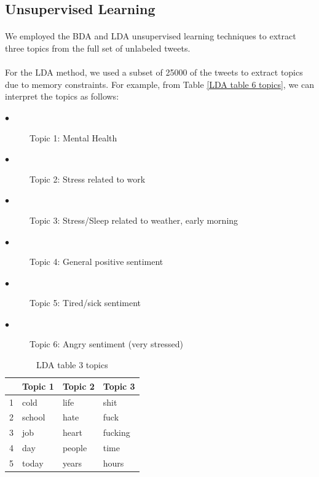 \documentclass{article}
\begin{document}
\paragraph{}

\subsection{Unsupervised Learning}
\paragraph{}

We employed the BDA and LDA unsupervised learning techniques to extract three topics from the full set of unlabeled tweets.  

\paragraph{}
For the LDA method, we used a subset of 25000 of the  tweets to extract topics due to memory constraints.  For example, from Table \ref{LDA table 6 topics}, we can interpret the topics as follows:

\begin{description}
   \item[$\bullet$ ] Topic 1: Mental Health
   \item[$\bullet$ ] Topic 2: Stress related to work
   \item[$\bullet$ ] Topic 3: Stress/Sleep related to weather, early morning
   \item[$\bullet$ ] Topic 4: General positive sentiment
   \item[$\bullet$ ] Topic 5: Tired/sick sentiment
   \item[$\bullet$ ] Topic 6: Angry sentiment (very stressed)
\end{description}


\begin{table}[htb]
\caption{LDA table 3 topics}
\label{LDA table 3 topics}
\centering
\begin{tabular}{rlll}
  \hline
 & Topic 1 & Topic 2 & Topic 3 \\ 
  \hline
1 & cold & life & shit \\ 
  2 & school & hate & fuck \\ 
  3 & job & heart & fucking \\ 
  4 & day & people & time \\ 
  5 & today & years & hours \\ 
   \hline
\end{tabular}
\end{table}
\end{document}
